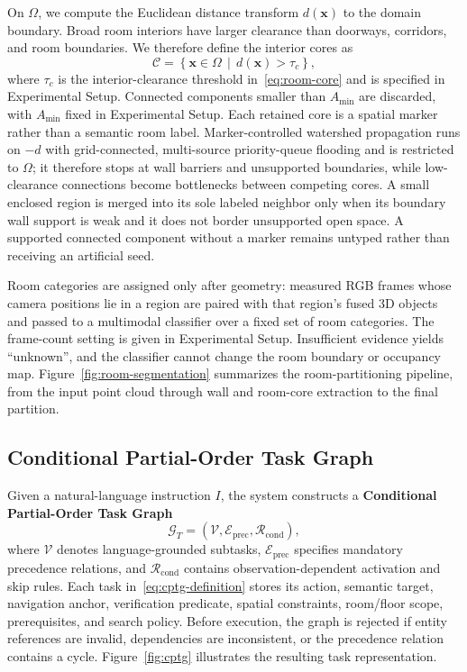 \documentclass[letterpaper,10pt,journal]{IEEEtran}
\begin{document}
On $\Omega$, we compute the Euclidean distance transform $d(\mathbf{x})$ to the domain boundary. Broad room interiors have larger clearance than doorways, corridors, and room boundaries. We therefore define the interior cores as
\begin{equation}
\mathcal C=\left\{\mathbf{x}\in\Omega\,\middle|\,
d(\mathbf{x})>\tau_c\right\},
\label{eq:room-core}
\end{equation}
where $\tau_c$ is the interior-clearance threshold in~\eqref{eq:room-core} and is specified in Experimental Setup. Connected components smaller than $A_{\min}$ are discarded, with $A_{\min}$ fixed in Experimental Setup. Each retained core is a spatial marker rather than a semantic room label. Marker-controlled watershed propagation runs on $-d$ with grid-connected, multi-source priority-queue flooding and is restricted to $\Omega$; it therefore stops at wall barriers and unsupported boundaries, while low-clearance connections become bottlenecks between competing cores. A small enclosed region is merged into its sole labeled neighbor only when its boundary wall support is weak and it does not border unsupported open space. A supported connected component without a marker remains untyped rather than receiving an artificial seed.

Room categories are assigned only after geometry: measured RGB frames whose camera positions lie in a region are paired with that region's fused 3D objects and passed to a multimodal classifier over a fixed set of room categories. The frame-count setting is given in Experimental Setup. Insufficient evidence yields ``unknown'', and the classifier cannot change the room boundary or occupancy map. Figure~\ref{fig:room-segmentation} summarizes the room-partitioning pipeline, from the input point cloud through wall and room-core extraction to the final partition.
\subsection{Conditional Partial-Order Task Graph}
\label{sec:cptg}

Given a natural-language instruction $I$, the system constructs a \textbf{Conditional Partial-Order Task Graph}
\begin{equation}
\mathcal G_T=(\mathcal V,\mathcal E_{\mathrm{prec}},\mathcal R_{\mathrm{cond}}),
\label{eq:cptg-definition}
\end{equation}
where $\mathcal V$ denotes language-grounded subtasks, $\mathcal E_{\mathrm{prec}}$ specifies mandatory precedence relations, and $\mathcal R_{\mathrm{cond}}$ contains observation-dependent activation and skip rules. Each task in~\eqref{eq:cptg-definition} stores its action, semantic target, navigation anchor, verification predicate, spatial constraints, room/floor scope, prerequisites, and search policy. Before execution, the graph is rejected if entity references are invalid, dependencies are inconsistent, or the precedence relation contains a cycle. Figure~\ref{fig:cptg} illustrates the resulting task representation.
\end{document}
